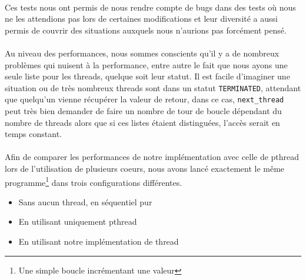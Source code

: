 \documentclass{article}
\begin{document}
    \paragraph{}
    Ces tests nous ont permis de nous rendre compte de bugs dans des tests
    où nous ne les attendions pas lors de certaines modifications et leur
    diversité a aussi permis de couvrir des situations auxquels nous
    n'aurions pas forcément pensé.
    \paragraph{}
    Au niveau des performances, nous sommes conscients qu'il y a de
    nombreux problèmes qui nuisent à la performance, entre autre le fait que
    nous ayons une seule liste pour les threads, quelque soit leur statut. Il
    est facile d'imaginer une situation ou de très nombreux threads sont dans
    un statut \verb!TERMINATED!, attendant que quelqu'un vienne récupérer
    la valeur de retour, dans ce cas, \verb!next_thread! peut très bien
    demander de faire un nombre de tour de boucle dépendant du nombre de
    threads alors que si ces listes étaient distinguées, l'accès serait en
    temps constant.
    \paragraph{}
    Afin de comparer les performances de notre implémentation avec celle de
    pthread lors de l'utilisation de plusieurs coeurs, nous avons lancé
    exactement le même programme\footnote{Une simple boucle incrémentant une
      valeur} dans trois configurations différentes.
    \begin{itemize}
      \item Sans aucun thread, en séquentiel pur
      \item En utilisant uniquement pthread
      \item En utilisant notre implémentation de thread
    \end{itemize}
\end{document}
